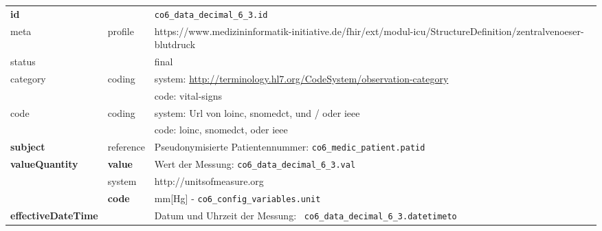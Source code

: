 \begin{longtable}{|l|l|p{7.5cm}|}
        \hline
        \rowcolor{lightgray} \multicolumn{3}{|l|}{Data Mapping (inhaltlich)} \\ \hline
        \textbf{id} &  & \texttt{co6\_data\_decimal\_6\_3.id} \\ \hline
	meta & profile & https://www.medizininformatik-initiative.de/fhir/ext/modul-icu/StructureDefinition/zentralvenoeser-blutdruck \\ \hline 
	status &  & final   \\ \hline 
	category & coding & system: \url{http://terminology.hl7.org/CodeSystem/observation-category} \\
\cline{3-3}
	& & code: vital-signs \\ \hline
	code & coding & system: Url von \ac{loinc}, \ac{snomedct}, und / oder \ac{ieee} \\ 
	\cline{3-3} 
	 &  & code: \ac{loinc}, \ac{snomedct}, oder \ac{ieee} \\ \hline
	 \textbf{subject}  & reference & Pseudonymisierte Patientennummer: \texttt{co6\_medic\_patient.patid} \\ \hline
	 \textbf{valueQuantity}  & \textbf{value} & Wert der Messung: \texttt{co6\_data\_decimal\_6\_3.val} \\
        \cline{2-3}
         & system & http://unitsofmeasure.org \\
         \cline{2-3}
         & \textbf{code} & mm[Hg] - \texttt{co6\_config\_variables.unit} \\ \hline
     \textbf{effectiveDateTime}  & & Datum und Uhrzeit der Messung: \texttt{
co6\_data\_decimal\_6\_3.datetimeto} \\ \hline
\end{longtable}
